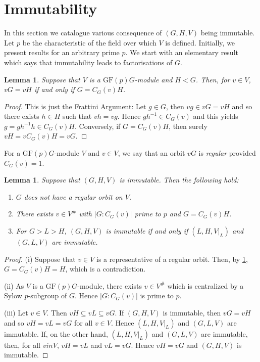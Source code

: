 \documentclass[12pt]{amsart}
\newtheorem{lemma}[theorem]{Lemma}
\theoremstyle{remark}
\theoremstyle{notation}
\theoremstyle{definition}
\newcommand{\GF}{\mathrm{GF}}
\newcommand{\0}{\emptyset}
\begin{document}


\section{Immutability}\label{sec:Immutability}

In this section we catalogue various consequence of  $(G,H,V)$ being immutable. Let $p$ be the characteristic of the field over which $V$ is defined. Initially, we present results for an arbitrary prime $p$. We start with an elementary result which says that immutability leads to factorisations of $G$.




\begin{lemma}\label{lem:basic1}
Suppose that $V$ is a $\GF(p)G$-module and $H < G$. Then, for $v \in V$,  $vG=vH$ if and only if $G= C_G(v)H$.
\end{lemma}

\begin{proof}
This is just the Frattini Argument: Let $g \in G$, then $vg \in vG=vH$ and so there exists $h \in H$ such that $vh= vg$.  Hence $gh^{-1}\in C_G(v)$ and this yields $g= gh^{-1}h \in C_G(v) H$. Conversely, if  $G= C_G(v)H$, then surely $vH= v{C_G(v)H}=vG$.
\end{proof}

For a $\GF(p)G$-module $V$ and $v \in V$, we say that an orbit $vG$ is \emph{regular} provided $C_G(v)=1$.

\begin{lemma}\label{lem:reg orb compendium}
Suppose that $(G,H,V)$ is immutable. Then the following hold:
\begin{enumerate}
\item $G$ does not have a regular orbit on $V$.
\item There exists $v \in V^\#$ with $|G:C_G(v)|$ prime to $p$ and $G=C_G(v)H$.
\item  For $G > L > H$, $(G,H,V)$ is immutable if and only if $(L,H,V|_L)$ and $(G,L,V)$ are immutable.
\end{enumerate}\end{lemma}

\begin{proof} (i) Suppose that $v \in V$ is a representative of a regular orbit.  Then, by \cref{lem:basic1}, $G=C_G(v)H=H$, which is a contradiction.

(ii) As $V$ is a $\GF(p)G$-module, there exists  $v \in V^\#$ which is centralized by a Sylow $p$-subgroup of $G$. Hence $|G:C_G(v)| $ is prime to $p$.


(iii) Let $v \in V$. Then $vH\subseteq vL\subseteq vG$. If $(G,H,V)$  is immutable, then  $vG=vH$ and so   $vH= vL=vG$ for all $v \in V$.  Hence $(L,H,V|_L)$ and $(G,L,V)$ are immutable. If, on the other hand, $(L,H,V|_L)$ and $(G,L,V)$ are immutable, then, for all $v in V$, $vH= vL$ and $vL=vG$. Hence $vH=vG$ and $(G,H,V)$  is immutable.
\end{proof}
\end{document}
